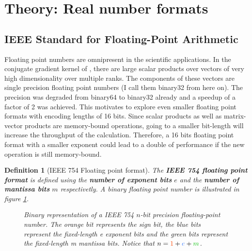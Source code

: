 \documentclass{article}
\theoremstyle{plain} %
\newtheorem{definition}{Definition}[section]
\theoremstyle{remark} %
\def\df#1{\textbf{\textit{#1}}}
\numberwithin{equation}{section}
\begin{document}

\section{Theory: Real number formats}
\label{sec:floats}

\subsection{IEEE Standard for Floating-Point Arithmetic}

Floating point numbers are omnipresent in the scientific applications. In the conjugate gradient kernel of \cite{openqxd}, there are large scalar products over vectors of very high dimensionality over multiple ranks. The components of these vectors are single precision floating point numbers (I call them \gls{binary32} from here on). The precision was degraded from \gls{binary64} to \gls{binary32} already and a speedup of a factor of 2 was achieved. This motivates to explore even smaller floating point formats with encoding lengths of 16 bits. Since scalar products as well as matrix-vector products are memory-bound operations, going to a smaller bit-length will increase the throughput of the calculation. Therefore, a 16 bits floating point format with a smaller exponent could lead to a double of performance if the new operation is still memory-bound.

\begin{definition}[IEEE 754 Floating point format]

The \df{IEEE 754 floating point format} \cite{ieee754_1985} is defined using the \df{number of exponent bits} $e$ and the \df{number of mantissa bits} $m$ respectivetly. A binary floating point number is illustrated in figure \ref{fig:float}.

\begin{figure}[H]
  
  \caption{Binary representation of a IEEE 754 $n$-bit precision floating-point number. The \textcolor{corange}{orange} bit represents the \textcolor{corange}{sign bit}, the \textcolor{cblue}{blue} bits represent the fixed-length \textcolor{cblue}{e exponent bits} and the \textcolor{cgreen}{green} bits represent the fixed-length \textcolor{cgreen}{m mantissa bits}. Notice that $n = \textcolor{corange}{1} + \textcolor{cblue}{e} + \textcolor{cgreen}{m}$.}
  \label{fig:float}
\end{figure}

\end{definition}
\end{document}
